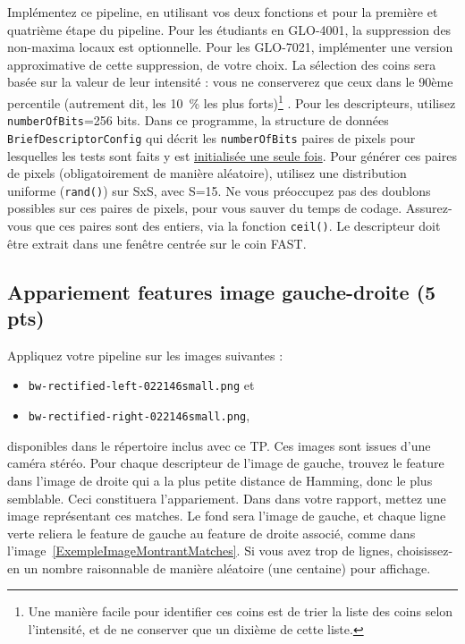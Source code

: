 \documentclass[12pt]{article}
\begin{document}
Implémentez ce pipeline, en utilisant vos deux fonctions  et  pour la première et quatrième étape du pipeline. Pour les étudiants en GLO-4001, la suppression des non-maxima locaux est optionnelle. Pour les GLO-7021, implémenter une version approximative de cette suppression, de votre choix. La sélection des coins sera basée sur la valeur de leur intensité : vous ne conserverez que ceux dans le 90ème percentile (autrement dit, les 10~\% les plus forts)\footnote{Une manière facile pour identifier ces coins est de trier la liste des coins selon l'intensité, et de ne conserver que un dixième de cette liste.} . Pour les descripteurs, utilisez \texttt{numberOfBits}=256 bits. Dans ce programme, la structure de données \texttt{BriefDescriptorConfig} qui décrit les \texttt{numberOfBits} paires de pixels pour lesquelles les tests sont faits y est  \underline{initialisée une seule fois}. Pour générer ces paires de pixels (obligatoirement de manière aléatoire), utilisez une distribution uniforme (\texttt{rand()}) sur SxS, avec S=15. Ne vous préoccupez pas des doublons possibles sur ces paires de pixels, pour vous sauver du temps de codage. Assurez-vous que ces paires sont des entiers, via la fonction \texttt{ceil()}. Le descripteur doit être extrait dans une fenêtre centrée sur le coin FAST.


\subsection{Appariement features image gauche-droite (5 pts)}
 Appliquez votre pipeline sur les images suivantes :
 \begin{itemize}
 \item \texttt{bw-rectified-left-022146small.png} et
 \item \texttt{bw-rectified-right-022146small.png},
 \end{itemize}
 disponibles dans le répertoire inclus avec ce TP. Ces images sont issues d'une caméra stéréo. Pour chaque descripteur de l'image de gauche, trouvez le feature dans l'image de droite qui a la plus petite distance de Hamming, donc le plus semblable. Ceci constituera l'appariement. Dans dans votre rapport, mettez une image représentant ces matches. Le fond sera l'image de gauche, et chaque ligne verte reliera le feature de gauche au feature de droite associé, comme dans l'image~\ref{ExempleImageMontrantMatches}. Si vous avez trop de lignes, choisissez-en un nombre raisonnable de manière aléatoire (une centaine) pour affichage.
\end{document}
